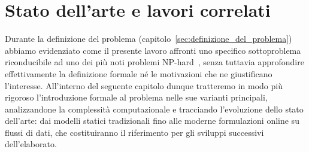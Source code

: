 \chapter{Stato dell'arte e lavori correlati}\label{cha:stato_dell_arte_e_lavori_correlati}

Durante la definizione del problema (capitolo~\ref{sec:definizione_del_problema}) abbiamo evidenziato come il presente lavoro affronti uno specifico sottoproblema riconducibile ad uno dei più noti problemi NP-hard~\cite{karp1972}, senza tuttavia approfondire effettivamente la definizione formale né le motivazioni che ne giustificano l'interesse.
All'interno del seguente capitolo dunque tratteremo in modo più rigoroso l'introduzione formale al problema nelle sue varianti principali, analizzandone la complessità computazionale e tracciando l'evoluzione dello stato dell'arte: dai modelli statici tradizionali fino alle moderne formulazioni online su flussi di dati, che costituiranno il riferimento per gli sviluppi successivi dell'elaborato.









%